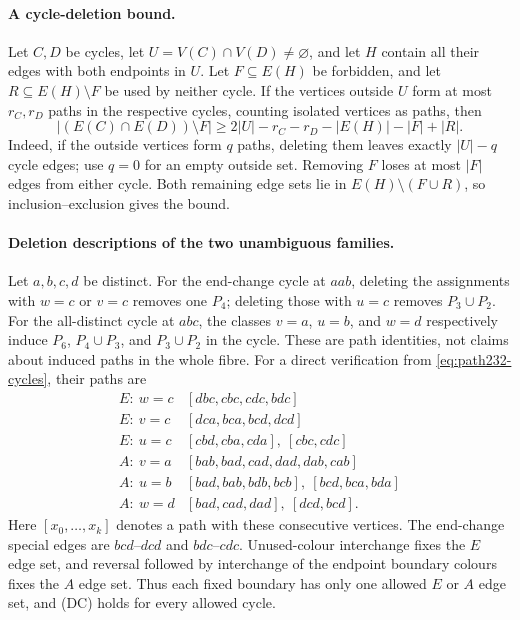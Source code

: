\paragraph{A cycle-deletion bound.}
Let $C,D$ be cycles, let $U=V(C)\cap V(D)\ne\varnothing$, and let
$H$ contain all their edges with both endpoints in $U$. Let $F\subseteq
E(H)$ be forbidden, and let $R\subseteq E(H)\setminus F$ be used by
neither cycle. If the vertices outside $U$ form at most $r_C,r_D$
paths in the respective cycles, counting isolated vertices as paths,
then
\[
 |(E(C)\cap E(D))\setminus F|
 \ge 2|U|-r_C-r_D-|E(H)|-|F|+|R|.                 \tag{DP}
\]
Indeed, if the outside vertices form $q$ paths, deleting them leaves
exactly $|U|-q$ cycle edges; use $q=0$ for an empty outside set.
Removing $F$ loses at most $|F|$ edges from either cycle. Both remaining
edge sets lie in $E(H)\setminus(F\cup R)$, so inclusion--exclusion gives
the bound.

\paragraph{Deletion descriptions of the two unambiguous families.}
Let $a,b,c,d$ be distinct. For the end-change cycle at $aab$, deleting
the assignments with $w=c$ or $v=c$ removes one $P_4$; deleting those
with $u=c$ removes $P_3\cup P_2$. For the all-distinct cycle at $abc$,
the classes $v=a$, $u=b$, and $w=d$ respectively induce $P_6$,
$P_4\cup P_3$, and $P_3\cup P_2$ in the cycle. These are path
identities, not claims about induced paths in the whole fibre.
For a direct verification from \eqref{eq:path232-cycles}, their paths are
\[
\begin{array}{c|l}
E:\ w=c &[dbc,cbc,cdc,bdc]\\
E:\ v=c &[dca,bca,bcd,dcd]\\
E:\ u=c &[cbd,cba,cda],\ [cbc,cdc]\\[2pt]
A:\ v=a &[bab,bad,cad,dad,dab,cab]\\
A:\ u=b &[bad,bab,bdb,bcb],\ [bcd,bca,bda]\\
A:\ w=d &[bad,cad,dad],\ [dcd,bcd].
\end{array}                                                     \tag{DC}
\]
Here $[x_0,\ldots,x_k]$ denotes a path with these consecutive vertices.
The end-change special edges are $bcd$--$dcd$ and $bdc$--$cdc$.
Unused-colour interchange fixes the $E$ edge set, and reversal followed
by interchange of the endpoint boundary colours fixes the $A$ edge set.
Thus each fixed boundary has only one allowed $E$ or $A$ edge set,
and (DC) holds for every allowed cycle.

